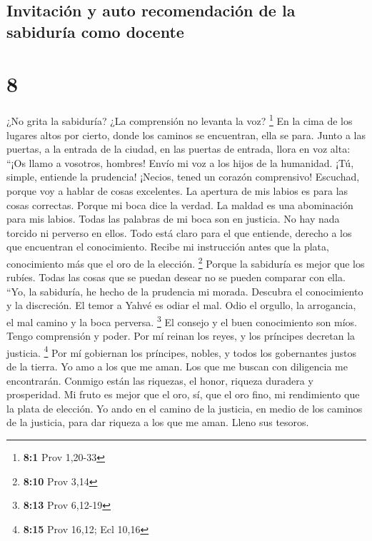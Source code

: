 \hypertarget{invitaciuxf3n-y-auto-recomendaciuxf3n-de-la-sabiduruxeda-como-docente}{%
\subsection{Invitación y auto recomendación de la sabiduría como
docente}\label{invitaciuxf3n-y-auto-recomendaciuxf3n-de-la-sabiduruxeda-como-docente}}

\hypertarget{section-7}{%
\section{8}\label{section-7}}

 ¿No grita la sabiduría? ¿La comprensión no levanta la
voz? \footnote{\textbf{8:1} Prov 1,20-33}  En la cima de
los lugares altos por cierto, donde los caminos se encuentran, ella se
para.  Junto a las puertas, a la entrada de la ciudad, en
las puertas de entrada, llora en voz alta:  ``¡Os llamo a
vosotros, hombres! Envío mi voz a los hijos de la humanidad.
 ¡Tú, simple, entiende la prudencia! ¡Necios, tened un
corazón comprensivo!  Escuchad, porque voy a hablar de
cosas excelentes. La apertura de mis labios es para las cosas correctas.
 Porque mi boca dice la verdad. La maldad es una
abominación para mis labios.  Todas las palabras de mi
boca son en justicia. No hay nada torcido ni perverso en ellos.
 Todo está claro para el que entiende, derecho a los que
encuentran el conocimiento.  Recibe mi instrucción antes
que la plata, conocimiento más que el oro de la elección. \footnote{\textbf{8:10}
  Prov 3,14}  Porque la sabiduría es mejor que los
rubíes. Todas las cosas que se puedan desear no se pueden comparar con
ella.  ``Yo, la sabiduría, he hecho de la prudencia mi
morada. Descubra el conocimiento y la discreción.  El
temor a Yahvé es odiar el mal. Odio el orgullo, la arrogancia, el mal
camino y la boca perversa. \footnote{\textbf{8:13} Prov 6,12-19}
 El consejo y el buen conocimiento son míos. Tengo
comprensión y poder.  Por mí reinan los reyes, y los
príncipes decretan la justicia. \footnote{\textbf{8:15} Prov 16,12; Ecl
  10,16}  Por mí gobiernan los príncipes, nobles, y todos
los gobernantes justos de la tierra.  Yo amo a los que me
aman. Los que me buscan con diligencia me encontrarán. 
Conmigo están las riquezas, el honor, riqueza duradera y prosperidad.
 Mi fruto es mejor que el oro, sí, que el oro fino, mi
rendimiento que la plata de elección.  Yo ando en el
camino de la justicia, en medio de los caminos de la justicia,
 para dar riqueza a los que me aman. Lleno sus tesoros.

